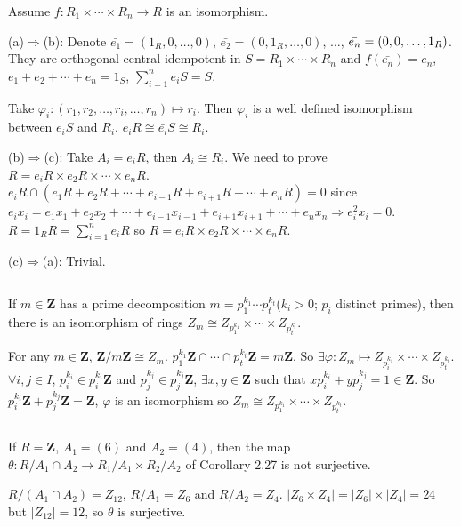 \begin{answer}
    Assume $f:R_{1}\times \cdots\times R_{n}\to R$ is an isomorphism.

    (a)$\Rightarrow$(b): Denote $\bar{e_{1}}=(1_{R},0,\dots,0)$, $\bar{e_{2}}=(0,1_{R},\dots,0)$, $\dots$, $\bar{e_{n}}=(0, 0, \dots,\\1_{R})$. They are orthogonal central idempotent in $S=R_{1}\times \cdots\times R_{n}$ and $f(\bar{e_{n}})=e_{n}$, $e_{1}+e_{2}+\cdots+e_{n}=1_{S}$, $\sum\limits_{i=1}^{n}e_{i}S=S$.
    
    Take  $\varphi_{i}:(r_{1}, r_{2},\dots, r_{i}, \dots, r_{n})\mapsto r_{i}$. Then $\varphi_{i}$ is a well defined isomorphism between $e_{i}S$ and $R_{i}$. $e_{i}R\cong \bar{e_{i}}S\cong R_{i}$.

    (b)$\Rightarrow$(c): Take $A_{i}=e_{i}R$, then $A_{i}\cong R_{i}$. We need to prove $R=e_{i}R\times e_{2}R\times \cdots\times e_{n}R$. $e_{i}R\cap (e_{1}R+e_{2}R+\cdots+e_{i-1}R+e_{i+1}R+\cdots+e_{n}R)=0$ since $e_{i}x_{i}=e_{1}x_{1}+e_{2}x_{2}+\cdots+e_{i-1}x_{i-1}+e_{i+1}x_{i+1}+\cdots+e_{n}x_{n}\Rightarrow e_{i}^{2}x_{i}=0$. $R=1_{R}R=\sum\limits_{i=1}^{n}e_{i}R$ so $R=e_{i}R\times e_{2}R\times \cdots\times e_{n}R$.

    (c)$\Rightarrow$(a): Trivial.
\end{answer}

$$ $$

\begin{ex}
    If $m\in \mathbf{Z}$ has a prime decomposition $m=p_{1}^{k_{1}}\cdots p_{t}^{k_{t}}$($k_{i}>0$; $p_{i}$ distinct primes), then there is an isomorphism of rings $Z_{m}\cong Z_{p_{1}^{k_{1}}}\times \cdots\times Z_{p_{t}^{k_{t}}}$.
\end{ex}

\begin{answer}
    For any $m\in\mathbf{Z}$, $\mathbf{Z} /m\mathbf{Z}\cong Z_{m}$. $p_{1}^{k_{1}}\mathbf{Z}\cap\cdots\cap p_{t}^{k_{t}}\mathbf{Z}=m\mathbf{Z}$. So $\exists \varphi:Z_{m}\mapsto Z_{p_{i}^{k_{1}}}\times \cdots\times Z_{p_{t}^{k_{t}}}$. $\forall i,j\in I$, $p_{i}^{k_{i}}\in p_{i}^{k_{i}}\mathbf{Z}$ and $p_{j}^{k_{j}}\in p_{j}^{k_{j}}\mathbf{Z}$, $\exists x,y\in \mathbf{Z}$ such that $xp_{i}^{k_{i}}+yp_{j}^{k_{j}}=1\in\mathbf{Z}$. So $p_{i}^{k_{i}}\mathbf{Z}+p_{j}^{k_{j}}\mathbf{Z}=\mathbf{Z}$, $\varphi$ is an isomorphism so $Z_{m}\cong Z_{p_{1}^{k_{1}}}\times \cdots\times Z_{p_{t}^{k_{t}}}$.
\end{answer}

$$ $$

\begin{ex}
    If $R=\mathbf{Z}$, $A_{1}=(6)$ and $A_{2}=(4)$, then the map $\theta :R /A_{1}\cap A_{2}\to R_{1} /A_{1}\times R_{2} /A_{2}$ of Corollary 2.27 is not surjective.
\end{ex}

\begin{answer}
    $R /(A_{1}\cap A_{2})=Z_{12}$, $R /A_{1}=Z_{6}$ and $R /A_{2}=Z_{4}$. $\left| Z_{6}\times Z_{4} \right| =\left| Z_{6} \right| \times \left| Z_{4} \right| =24$ but $\left| Z_{12} \right| =12$, so $\theta$ is surjective.
\end{answer}
